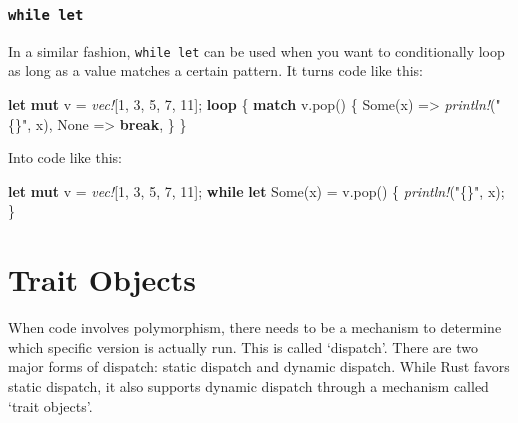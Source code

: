 \documentclass[a4paper,]{book}
\renewcommand*{\hypertarget}[3][\ar]{%
  \def\ar{#2}%
  \label{#1}%
  #3}
\newenvironment{Shaded}{\begin{snugshade}}{\end{snugshade}}
\newcommand{\KeywordTok}[1]{\textcolor[rgb]{0.13,0.29,0.53}{\textbf{{#1}}}}
\newcommand{\DecValTok}[1]{\textcolor[rgb]{0.00,0.00,0.81}{{#1}}}
\newcommand{\ConstantTok}[1]{\textcolor[rgb]{0.00,0.00,0.00}{{#1}}}
\newcommand{\StringTok}[1]{\textcolor[rgb]{0.31,0.60,0.02}{{#1}}}
\newcommand{\PreprocessorTok}[1]{\textcolor[rgb]{0.56,0.35,0.01}{\textit{{#1}}}}
\newcommand{\NormalTok}[1]{{#1}}
\begin{document}
\subsubsection{\texorpdfstring{\texttt{while\ let}}{while let}}\label{while-let}

In a similar fashion, \texttt{while\ let} can be used when you want to
conditionally loop as long as a value matches a certain pattern. It
turns code like this:

\begin{Shaded}
\begin{Highlighting}[]
\KeywordTok{let} \KeywordTok{mut} \NormalTok{v = }\PreprocessorTok{vec!}\NormalTok{[}\DecValTok{1}\NormalTok{, }\DecValTok{3}\NormalTok{, }\DecValTok{5}\NormalTok{, }\DecValTok{7}\NormalTok{, }\DecValTok{11}\NormalTok{];}
\KeywordTok{loop} \NormalTok{\{}
    \KeywordTok{match} \NormalTok{v.pop() \{}
        \ConstantTok{Some}\NormalTok{(x) =>  }\PreprocessorTok{println!}\NormalTok{(}\StringTok{"\{\}"}\NormalTok{, x),}
        \ConstantTok{None} \NormalTok{=> }\KeywordTok{break}\NormalTok{,}
    \NormalTok{\}}
\NormalTok{\}}
\end{Highlighting}
\end{Shaded}

Into code like this:

\begin{Shaded}
\begin{Highlighting}[]
\KeywordTok{let} \KeywordTok{mut} \NormalTok{v = }\PreprocessorTok{vec!}\NormalTok{[}\DecValTok{1}\NormalTok{, }\DecValTok{3}\NormalTok{, }\DecValTok{5}\NormalTok{, }\DecValTok{7}\NormalTok{, }\DecValTok{11}\NormalTok{];}
\KeywordTok{while} \KeywordTok{let} \ConstantTok{Some}\NormalTok{(x) = v.pop() \{}
    \PreprocessorTok{println!}\NormalTok{(}\StringTok{"\{\}"}\NormalTok{, x);}
\NormalTok{\}}
\end{Highlighting}
\end{Shaded}

\hypertarget{sec--trait-objects}{\section{Trait
Objects}\label{sec--trait-objects}}

When code involves polymorphism, there needs to be a mechanism to
determine which specific version is actually run. This is called
`dispatch'. There are two major forms of dispatch: static dispatch and
dynamic dispatch. While Rust favors static dispatch, it also supports
dynamic dispatch through a mechanism called `trait objects'.
\end{document}
